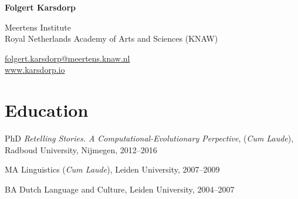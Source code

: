 \documentclass[12pt,letterpaper]{report}
\newcommand{\myname}{Folgert Karsdorp}
\newcommand{\namefont}[1]{{\normalfont\bfseries\Huge{#1}}}
\begin{document}
    \raggedright{}

    \namefont{\myname}

    \vspace{1em}
    \begin{minipage}[t]{0.600\textwidth}
        Meertens Institute \\
        Royal Netherlands Academy of Arts and Sciences (KNAW)
    \end{minipage}
    \begin{minipage}[t]{0.390\textwidth}
        \flushright{}
        \href{mailto:folgert.karsdorp@meertens.knaw.nl}{folgert.karsdorp@meertens.knaw.nl} \\
        \href{https://www.karsdorp.io}{www.karsdorp.io}
    \end{minipage}

\section*{Education}
\begin{tablist}
\item[PhD] \tab{}\textit{Retelling Stories. A Computational-Evolutionary Perpective},
  (\textit{Cum Laude}), Radboud University, Nijmegen, 2012--2016
  \item[MA] \tab{}Linguistics (\textit{Cum Laude}), Leiden University, 2007--2009
  \item[BA]  \tab{}Dutch Language and Culture, Leiden University, 2004--2007
\end{tablist}
\end{document}
